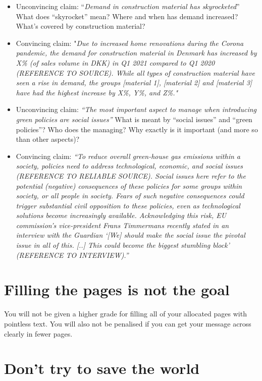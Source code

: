 \documentclass[
]{book}
\begin{document}
\begin{itemize}
\item
  Unconvincing claim: ``\emph{Demand in construction material has skyrocketed}'' What does ``skyrocket'' mean? Where and when has
  demand increased? What's covered by construction material?
\item
  Convincing claim: "\emph{Due to increased home renovations during the Corona pandemic, the demand for construction material in Denmark has increased by X\% (of sales volume in DKK) in Q1 2021 compared to Q1 2020 (REFERENCE TO SOURCE). While all types of construction material have seen a rise in demand, the groups {[}material 1{]}, {[}material 2{]} and {[}material 3{]} have had the highest increase by X\%, Y\%, and Z\%."}
\item
  Unconvincing claim: \emph{``The most important aspect to manage when introducing green policies are social issues''} What is meant by ``social issues'' and ``green policies''? Who does the managing? Why exactly is it important (and more so than other aspects)?
\item
  Convincing claim: \emph{``To reduce overall green-house gas emissions within a society, policies need to address technological, economic, and social issues (REFERENCE TO RELIABLE SOURCE). Social issues here refer to the potential (negative) consequences of these policies for some groups within society, or all people in society. Fears of such negative consequences could trigger substantial civil opposition to these policies, even as technological solutions become increasingly available. Acknowledging this risk, EU commission's vice-president Frans Timmermans recently stated in an interview with the Guardian\emph{
  `{[}We{]} should make the social issue the pivotal issue in all of this. {[}..{]} This could become the biggest stumbling block' }(REFERENCE TO INTERVIEW).''}
\end{itemize}

\hypertarget{filling-the-pages-is-not-the-goal}{%
\section{Filling the pages is not the goal}\label{filling-the-pages-is-not-the-goal}}

You will not be given a higher grade for filling all of your allocated pages with pointless text. You will also not be penalised if you can get your message across clearly in fewer pages.

\hypertarget{dont-try-to-save-the-world}{%
\section{Don't try to save the world}\label{dont-try-to-save-the-world}}
\end{document}
